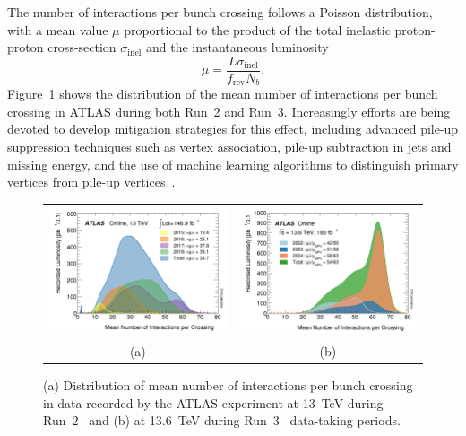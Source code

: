 The number of interactions per bunch crossing follows a Poisson distribution, with a mean value $\mu$ proportional to the product of the total inelastic proton-proton cross-section $\sigma_{\text{inel}}$ and the instantaneous luminosity~\cite{pileup}
\begin{equation}
    \mu = \frac{\textit{L}\sigma_{\text{inel}}}{f_{\text{rev}}N_{b}}.
\end{equation}
Figure~\ref{fig:pileup} shows the distribution of the mean number of interactions per bunch crossing in ATLAS during both Run~2 and Run~3.
Increasingly efforts are being devoted to develop mitigation strategies for this effect, including advanced pile-up suppression techniques such as vertex association, pile-up subtraction in jets and missing energy, and the use of machine learning algorithms to distinguish primary vertices from pile-up vertices~\cite{ATL-PHYS-PUB-2023-011,ATLAS:2017pfq,Soyez_2019}.
\begin{figure}[htbp]
    \centering
    \begin{tabular}{cc}
        \includegraphics[width=0.5\linewidth]{images/mu_2015_2018.png} &
        \includegraphics[width=0.5\linewidth]{images/mu_2022_2024.png} \\
        (a) & (b)  \\
    \end{tabular}
    \caption{(a) Distribution of mean number of interactions per bunch crossing in data recorded by the ATLAS experiment at 13~TeV during Run~2~\cite{atlas:Run2lumi} and  (b) at 13.6~TeV during Run~3~\cite{atlas:Run2lumi} data-taking periods.}
    \label{fig:pileup}
    \end{figure}
